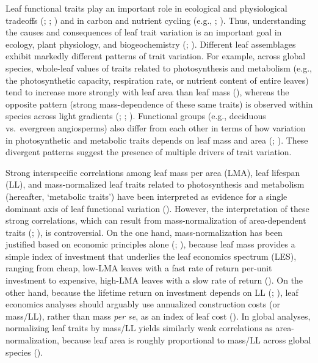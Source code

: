 \documentclass[
  12pt,
  letterpaper,
  DIV=11,
  numbers=noendperiod]{scrartcl}
\begin{document}
Leaf functional traits play an important role in ecological and
physiological tradeoffs (;
; ) and in carbon and nutrient cycling (e.g.,
;
). Thus,
understanding the causes and consequences of leaf trait variation is an
important goal in ecology, plant physiology, and biogeochemistry
(;
). Different leaf
assemblages exhibit markedly different patterns of trait variation. For
example, across global species, whole-leaf values of traits related to
photosynthesis and metabolism (e.g., the photosynthetic capacity,
respiration rate, or nutrient content of entire leaves) tend to increase
more strongly with leaf area than leaf mass
(), whereas the opposite
pattern (strong mass-dependence of these same traits) is observed within
species across light gradients (; ;
). Functional groups (e.g.,
deciduous vs.~evergreen angiosperms) also differ from each other in
terms of how variation in photosynthetic and metabolic traits depends on
leaf mass and area (;
). These divergent patterns
suggest the presence of multiple drivers of trait variation.

Strong interspecific correlations among leaf mass per area (LMA), leaf
lifespan (LL), and mass-normalized leaf traits related to photosynthesis
and metabolism (hereafter, `metabolic traits') have been interpreted as
evidence for a single dominant axis of leaf functional variation
(). However, the
interpretation of these strong correlations, which can result from
mass-normalization of area-dependent traits
(;
), is controversial. On the
one hand, mass-normalization has been justified based on economic
principles alone (;
), because leaf mass
provides a simple index of investment that underlies the leaf economics
spectrum (LES), ranging from cheap, low-LMA leaves with a fast rate of
return per-unit investment to expensive, high-LMA leaves with a slow
rate of return (). On the
other hand, because the lifetime return on investment depends on LL
(;
), leaf economics
analyses should arguably use annualized construction costs (or mass/LL),
rather than mass \emph{per se}, as an index of leaf cost
(). In global analyses,
normalizing leaf traits by mass/LL yields similarly weak correlations as
area-normalization, because leaf area is roughly proportional to mass/LL
across global species ().
\end{document}
